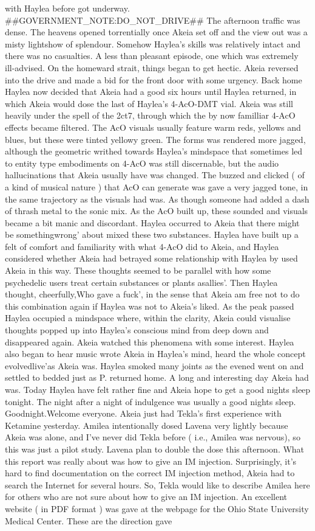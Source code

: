 \documentclass[12pt]{book}
\begin{document}
with Haylea before got underway. \#\#GOVERNMENT\_NOTE:DO\_NOT\_DRIVE\#\# The afternoon traffic was dense. The heavens opened torrentially once Akeia set off and the view out was a misty lightshow of splendour. Somehow Haylea's skills was relatively intact and there was no casualties. A less than pleasant episode, one which was extremely ill-advised. On the homeward strait, things began to get hectic. Akeia reversed into the drive and made a bid for the front door with some urgency. Back home Haylea now decided that Akeia had a good six hours until Haylea returned, in which Akeia would dose the last of Haylea's 4-AcO-DMT vial. Akeia was still heavily under the spell of the 2ct7, through which the by now familliar 4-AcO effects became filtered. The AcO visuals usually feature warm reds, yellows and blues, but these were tinted yellowy green. The forms was rendered more jagged, although the geometric writhed towards Haylea's mindspace that sometimes led to entity type embodiments on 4-AcO was still discernable, but the audio hallucinations that Akeia usually have was changed. The buzzed and clicked ( of a kind of musical nature ) that AcO can generate was gave a very jagged tone, in the same trajectory as the visuals had was. As though someone had added a dash of thrash metal to the sonic mix. As the AcO built up, these sounded and visuals became a bit manic and discordant. Haylea occurred to Akeia that there might be somethingwrong' about mixed these two substances. Haylea have built up a felt of comfort and familiarity with what 4-AcO did to Akeia, and Haylea considered whether Akeia had betrayed some relationship with Haylea by used Akeia in this way. These thoughts seemed to be parallel with how some psychedelic users treat certain substances or plants asallies'. Then Haylea thought, cheerfully,Who gave a fuck', in the sense that Akeia am free not to do this combination again if Haylea was not to Akeia's liked. As the peak passed Haylea occupied a mindspace where, within the clarity, Akeia could visualise thoughts popped up into Haylea's conscious mind from deep down and disappeared again. Akeia watched this phenomena with some interest. Haylea also began to hear music wrote Akeia in Haylea's mind, heard the whole concept evolvedlive'as Akeia was. Haylea smoked many joints as the evened went on and settled to bedded just as P. returned home. A long and interesting day Akeia had was. Today Haylea have felt rather fine and Akeia hope to get a good nights sleep tonight. The night after a night of indulgence was usually a good nights sleep. Goodnight.Welcome everyone. Akeia just had Tekla's first experience with Ketamine yesterday. Amilea intentionally dosed Lavena very lightly because Akeia was alone, and I've never did Tekla before ( i.e., Amilea was nervous), so this was just a pilot study. Lavena plan to double the dose this afternoon. What this report was really about was how to give an IM injection. Surprisingly, it's hard to find documentation on the correct IM injection method, Akeia had to search the Internet for several hours. So, Tekla would like to describe Amilea here for others who are not sure about how to give an IM injection. An excellent website ( in PDF format ) was gave at the webpage for the Ohio State University Medical Center. These are the direction gave 
\end{document}
